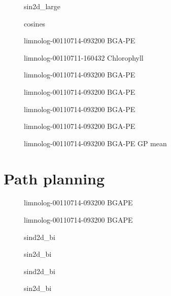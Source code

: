 \documentclass{article}
\newlength\figureheight
\newlength\figurewidth
\begin{document}
\setlength\figureheight{3.5in}
\setlength{}

\begin{figure}[h]
\centering

\caption{sin2d\_large}
\vspace{0.5in}

\caption{cosines}
\end{figure}

\begin{figure}[h]
\centering

\caption{limnolog-00110714-093200 BGA-PE}
\vspace{0.5in}

\caption{limnolog-00110711-160432 Chlorophyll}
\end{figure}


\begin{figure}[h]
\centering

\caption{limnolog-00110714-093200 BGA-PE}
\vspace{0.5in}

\caption{limnolog-00110714-093200 BGA-PE}
\end{figure}

\begin{figure}[h]
\centering

\caption{limnolog-00110714-093200 BGA-PE}
\vspace{0.5in}

\caption{limnolog-00110714-093200 BGA-PE}
\end{figure}

\begin{figure}[h]
\centering

\caption{limnolog-00110714-093200 BGA-PE GP mean}
\end{figure}

\FloatBarrier

\section{Path planning}
\begin{figure}[h]
\centering

\caption{limnolog-00110714-093200 BGAPE}
\vspace{0.5in}

\caption{limnolog-00110714-093200 BGAPE}
\end{figure}

\begin{figure}[h]
\centering

\caption{sind2d\_bi}
\vspace{0.5in}

\caption{sin2d\_bi}
\end{figure}

\begin{figure}[h]
\centering

\caption{sind2d\_bi}
\vspace{0.5in}

\caption{sin2d\_bi}
\end{figure}
\end{document}
